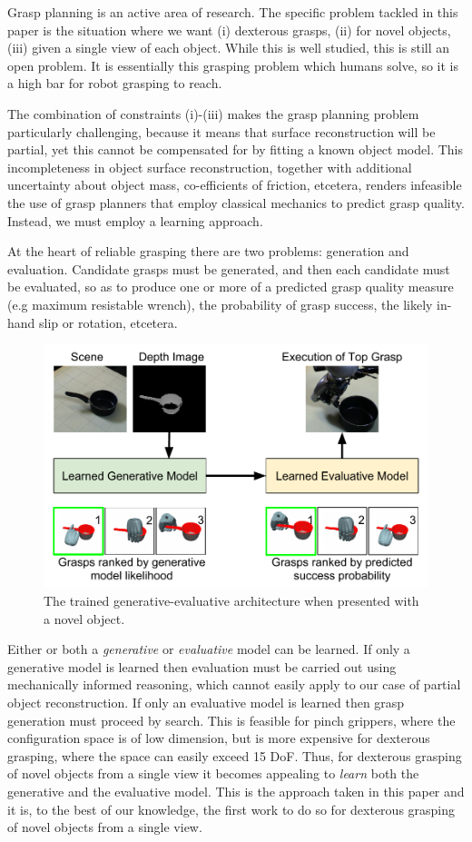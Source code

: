 Grasp planning is an active area of research. The specific problem tackled in this paper is the situation where we want (i) dexterous grasps, (ii) for novel objects, (iii) given a single view of each object. While this is well studied, this is still an open problem. It is essentially this grasping problem which humans solve, so it is a high bar for robot grasping to reach. 

The combination of constraints (i)-(iii) makes the grasp planning problem particularly challenging, because it means that surface reconstruction will be partial, yet this cannot be compensated for by fitting a known object model. This incompleteness in object surface reconstruction, together with additional uncertainty about object mass, co-efficients of friction, etcetera, renders infeasible the use of grasp planners that employ classical mechanics to predict grasp quality. Instead, we must employ a learning approach.

At the heart of reliable grasping there are two problems: generation and evaluation. Candidate grasps must be generated, and then each candidate must be evaluated, so as to produce one or more of a predicted grasp quality measure (e.g maximum resistable wrench), the probability of grasp success, the likely in-hand slip or rotation, etcetera. 
\begin{figure}[t]
  \includegraphics[width=\columnwidth]{images/contribution.pdf}
  \caption{The trained generative-evaluative architecture when presented with a novel object.}
\label{fig:systemArchitecture}
\end{figure}
Either or both a {\em generative} or {\em evaluative} model can be learned. If only a generative model is learned then evaluation must be carried out using mechanically informed reasoning, which cannot easily apply to our case of partial object reconstruction. If only an evaluative model is learned then grasp generation must proceed by search. This is feasible for pinch grippers, where the configuration space is of low dimension, but is more expensive for dexterous grasping, where the space can easily exceed 15 DoF. Thus, for dexterous grasping of novel objects from a single view it becomes appealing to {\em learn} both the generative and the evaluative model. This is the approach taken in this paper and it is, to the best of our knowledge, the first work to do so for dexterous grasping of novel objects from a single view.

